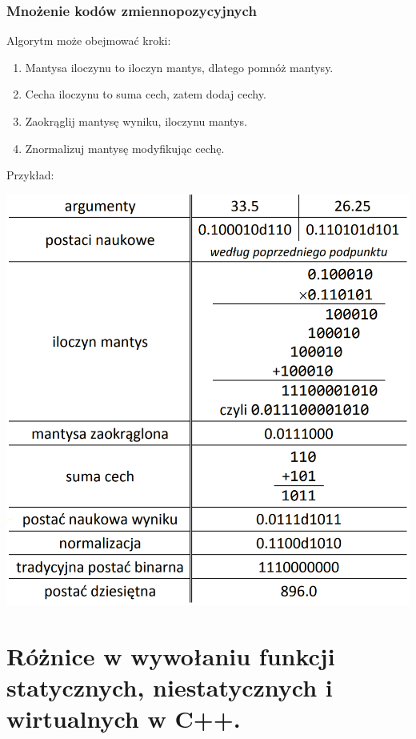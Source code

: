 \documentclass[12pt]{article}
\begin{document}
    \subsubsection{Mnożenie kodów zmiennopozycyjnych}
    Algorytm może obejmować kroki:
    \begin{enumerate}
        \item Mantysa iloczynu to iloczyn mantys, dlatego
        pomnóż mantysy.
        \item Cecha iloczynu to suma cech, zatem dodaj
        cechy.
        \item Zaokrąglij mantysę wyniku, iloczynu mantys.
        \item Znormalizuj mantysę modyfikując cechę.
    \end{enumerate}
    Przykład:\\
    \begin{center}
        \includegraphics[scale=0.4]{graphics/number-repr/fl-pt-mult.png}
    \end{center}

    \newpage

    \section{Różnice w wywołaniu funkcji statycznych, niestatycznych i wirtualnych w C++.}
\end{document}
